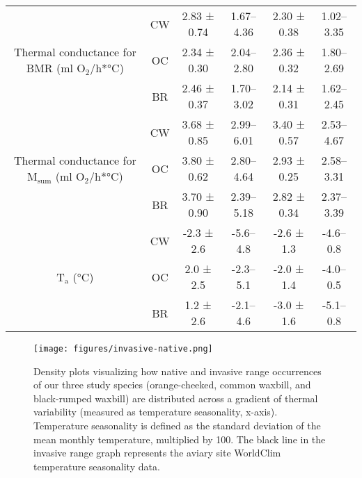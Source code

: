 \documentclass[10pt, twoside]{book} %
\begin{document}
\begin{sidewaystable}[!ht]
\begin{center}
\begin{footnotesize}
\begin{tabular}{cccccc}
        \multirow{3}{*}{Thermal conductance for BMR (ml O$_{\text{2}}$/h*°C)} & CW & 2.83 ± 0.74 & 1.67–4.36 & 2.30 ± 0.38 & 1.02–3.35 \\ \cline{2-6}
        ~ & OC & 2.34 ± 0.30 & 2.04–2.80 & 2.36 ± 0.32 & 1.80–2.69 \\ \cline{2-6}
        ~ & BR & 2.46 ± 0.37 & 1.70–3.02 & 2.14 ± 0.31 & 1.62–2.45 \\ \hline
        \multirow{3}{*}{Thermal conductance for M$_{\text{sum}}$ (ml O$_{\text{2}}$/h*°C)} & CW & 3.68 ± 0.85 & 2.99–6.01 & 3.40 ± 0.57 & 2.53–4.67 \\ \cline{2-6}
        ~ & OC & 3.80 ± 0.62 & 2.80–4.64 & 2.93 ± 0.25 & 2.58–3.31 \\ \cline{2-6}
        ~ & BR & 3.70 ± 0.90 & 2.39–5.18 & 2.82 ± 0.34 & 2.37–3.39 \\ \hline
        \multirow{3}{*}{T$_{\text{a}}$ (°C)} & CW & -2.3 ± 2.6 & -5.6–4.8 & -2.6 ± 1.3 & -4.6–0.8 \\ \cline{2-6}
        ~ & OC & 2.0 ± 2.5 & -2.3–5.1 & -2.0 ± 1.4 & -4.0–0.5 \\ \cline{2-6}
        ~ & BR & 1.2 ± 2.6 & -2.1–4.6 & -3.0 ± 1.6 & -5.1–0.8 \\ \hline
    \end{tabular}
\end{footnotesize}
		\end{center}
\end{sidewaystable}
\clearpage

\renewcommand{\thefigure}{1.\arabic{figure}}
	\begin{figure}[h!]
\small
		\begin{center}
			\texttt{[image: figures/invasive-native.png]}
		\end{center}
		\begin{footnotesize}
			\caption{Density plots visualizing how native and invasive range occurrences of our three study species (orange-cheeked, common waxbill, and black-rumped waxbill) are distributed across a gradient of thermal variability (measured as temperature seasonality, x-axis). Temperature seasonality is defined as the standard deviation of the mean monthly temperature, multiplied by 100. The black line in the invasive range graph represents the aviary site WorldClim temperature seasonality data. \label{fig1.1}}
		\end{footnotesize}
	\end{figure}
\clearpage
\end{document}
